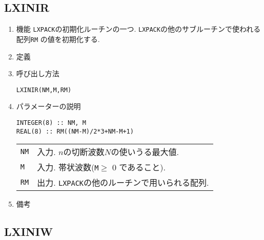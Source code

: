 \documentclass[a4j]{jarticle}
\begin{document}
\subsection{LXINIR}

\begin{enumerate}

\item 機能
\texttt{LXPACK}の初期化ルーチンの一つ.
\texttt{LXPACK}の他のサブルーチンで使われる配列\texttt{RM}
の値を初期化する.

\item 定義

\item 呼び出し方法 
    
\texttt{LXINIR(NM,M,RM)}
  
\item パラメーターの説明

\begin{verbatim}
INTEGER(8) :: NM, M
REAL(8) :: RM((NM-M)/2*3+NM-M+1)
\end{verbatim}
      
\begin{tabular}{ll}
\texttt{NM} & 入力. $n$の切断波数$N$の使いうる最大値.\\
\texttt{M} & 入力. 帯状波数(\texttt{M}$\ge$ 0 であること).\\
\texttt{RM}  & 出力. \texttt{LXPACK}の他のルーチンで用いられる配列.
\end{tabular}

\item 備考

\end{enumerate}

\subsection{LXINIW}
\end{document}

